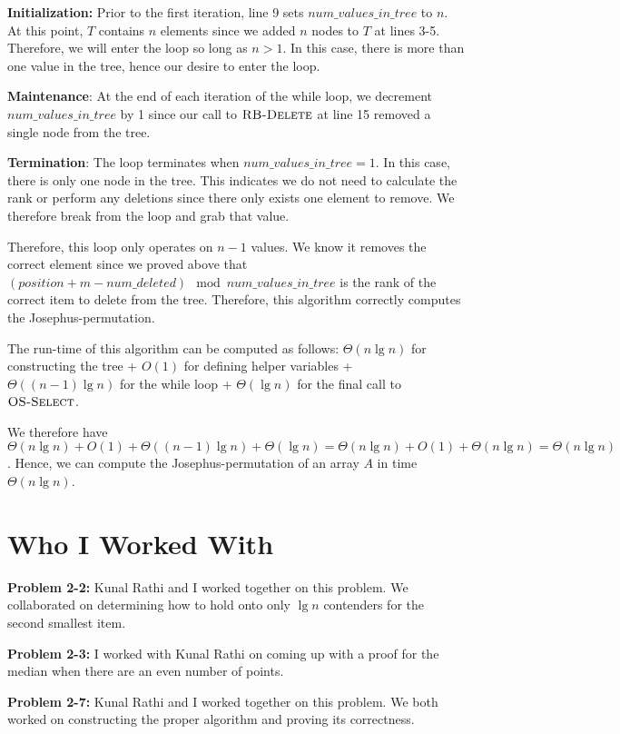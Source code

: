 \documentclass[11pt]{article}
\begin{document}
\textbf{Initialization:} Prior to the first iteration, line 9 sets $num\_values\_in\_tree$ to $n$. At this point, $T$ contains $n$ elements since we added $n$ nodes to $T$ at lines 3-5. Therefore, we will enter the loop so long as $n > 1$. In this case, there is more than one value in the tree, hence our desire to enter the loop.

\textbf{Maintenance}: At the end of each iteration of the while loop, we decrement $num\_values\_in\_tree$ by 1 since our call to $\textnormal{\scshape RB-Delete}$ at line 15 removed a single node from the tree.

\textbf{Termination}: The loop terminates when $num\_values\_in\_tree = 1$. In this case, there is only one node in the tree. This indicates we do not need to calculate the rank or perform any deletions since there only exists one element to remove. We therefore break from the loop and grab that value.

Therefore, this loop only operates on $n-1$ values. We know it removes the correct element since we proved above that $(position + m - num\_deleted) \mod num\_values\_in\_tree$ is the rank of the correct item to delete from the tree. Therefore, this algorithm correctly computes the Josephus-permutation.

The run-time of this algorithm can be computed as follows: $\Theta(n\lg{n})$ for constructing the tree + $O(1)$ for defining helper variables + $\Theta((n-1)\lg{n})$ for the while loop + $\Theta(\lg{n})$ for the final call to $\textnormal{\scshape OS-Select}$.

We therefore have $\Theta(n\lg{n}) + O(1) + \Theta((n-1)\lg{n}) + \Theta(\lg{n}) = \Theta(n\lg{n}) + O(1) + \Theta(n\lg{n}) = \Theta(n\lg{n})$. Hence, we can compute the Josephus-permutation of an array $A$ in time $\Theta(n\lg{n})$.

\newpage

\section{Who I Worked With}

\textbf{Problem 2-2:} Kunal Rathi and I worked together on this problem. We collaborated on determining how to hold onto only $\lg{n}$ contenders for the second smallest item.

\textbf{Problem 2-3:} I worked with Kunal Rathi on coming up with a proof for the median when there are an even number of points.

\textbf{Problem 2-7:} Kunal Rathi and I worked together on this problem. We both worked on constructing the proper algorithm and proving its correctness.
\end{document}
